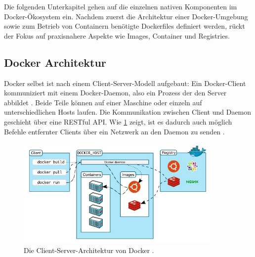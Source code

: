 \documentclass[../main.tex]{subfiles}
\begin{document}

		Die folgenden Unterkapitel gehen auf die einzelnen nativen Komponenten im Docker-Ökosystem ein. Nachdem zuerst die Architektur einer Docker-Umgebung sowie zum Betrieb von Containern benötigte Dockerfiles definiert werden, rückt der Fokus auf praxisnahere Aspekte wie Images, Container und Registries.



		\subsection{Docker Architektur}
		\label{dockerArchitecture}
      Docker selbst ist nach einem Client-Server-Modell aufgebaut: Ein Docker-Client kommuniziert mit einem Docker-Daemon, also ein Prozess der den Server abbildet \cite{dockerUnderstandingDocker}. Beide Teile können auf einer Maschine oder einzeln auf unterschiedlichen Hosts laufen. Die Kommunikation zwischen Client und Daemon geschieht über eine \acrshort{REST}ful \acrshort{API}. Wie \fig \ref{fig:intro_dockerArchitecture} zeigt, ist es dadurch auch möglich Befehle entfernter Clients über ein Netzwerk an den Daemon zu senden \cite{dockerSec1}.

      \begin{figure}[h]
          \centering
          \includegraphics[width=0.9\textwidth]{./images/intro_dockerArchitecture.jpg}
          \caption{Die Client-Server-Architektur von Docker \cite{dockerUnderstandingDocker}.}
          \label{fig:intro_dockerArchitecture}
      \end{figure}
\end{document}
